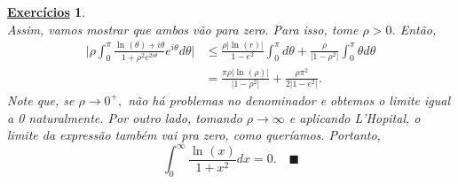 \documentclass{article}
\newtheorem*{exer*}{\underline{Exerc\'icios}}
\renewcommand\qedsymbol{$\blacksquare$}
\begin{document}
\begin{exer*}
\[    \]
    Assim, vamos mostrar que ambos vão para zero. Para isso, tome \(\rho > 0\). Então,
    \begin{align*}
      \biggl\vert \rho \int_{0}^{\pi }\frac{\ln^{}{(\theta )} + i\theta }{1 + \rho ^{2}e^{2i\theta }}e^{i\theta }d\theta  \biggr\vert &\leq \frac{\rho |\ln^{}{(r)}|}{1-e^{2}}\int_{0}^{\pi }d\theta + \frac{\rho }{|1-\rho ^{2}|}\int_{0}^{\pi }\theta d\theta \\
                                                                                                                                      &= \frac{\pi \rho |\ln^{}{(\rho )}|}{|1-\rho ^{2}|} + \frac{\rho \pi ^{2}}{2|1-e^{2}|}. 
    \end{align*}
    Note que, se \(\rho\to 0^{+},\) não há problemas no denominador e obtemos o limite igual a 0 naturalmente. Por outro lado, tomando 
    \(\rho \to \infty\) e aplicando L'Hopital, o limite da expressão também vai pra zero, como queríamos. Portanto,
    \[
      \int_{0}^{\infty}\frac{\ln^{}{(x)}}{1 + x^{2}}dx = 0.\quad \text{\qedsymbol }
    \]
  \end{exer*}
\end{document}
